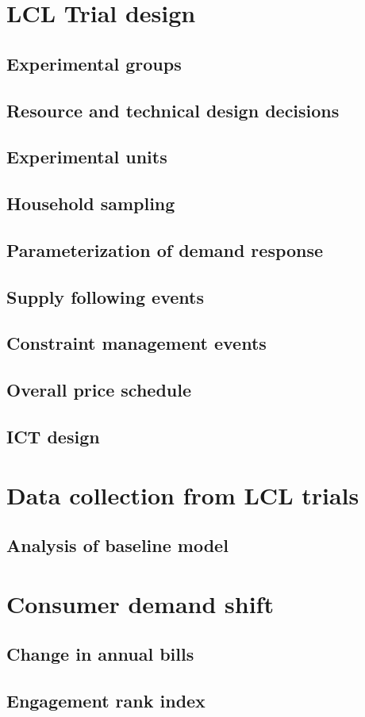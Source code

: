 \section{LCL Trial design}
\subsection{Experimental groups}

\subsection{Resource and technical design decisions}

\subsection{Experimental units}

\subsection{Household sampling}

\subsection{Parameterization of demand response}

\subsection{Supply following events}

\subsection{Constraint management events}

\subsection{Overall price schedule}

\subsection{ICT design}

\section{Data collection from LCL trials}
\subsection{Analysis of baseline model}

\section{Consumer demand shift}
\subsection{Change in annual bills}
\subsection{Engagement rank index}

